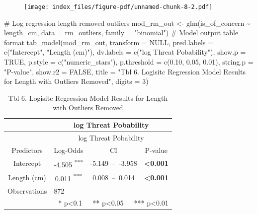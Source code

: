 \documentclass[
  letterpaper,
  DIV=11,
  numbers=noendperiod]{scrartcl}
\newenvironment{Shaded}{\begin{snugshade}}{\end{snugshade}}
\newcommand{\AttributeTok}[1]{\textcolor[rgb]{0.40,0.45,0.13}{#1}}
\newcommand{\CommentTok}[1]{\textcolor[rgb]{0.37,0.37,0.37}{#1}}
\newcommand{\ConstantTok}[1]{\textcolor[rgb]{0.56,0.35,0.01}{#1}}
\newcommand{\DecValTok}[1]{\textcolor[rgb]{0.68,0.00,0.00}{#1}}
\newcommand{\FloatTok}[1]{\textcolor[rgb]{0.68,0.00,0.00}{#1}}
\newcommand{\FunctionTok}[1]{\textcolor[rgb]{0.28,0.35,0.67}{#1}}
\newcommand{\NormalTok}[1]{\textcolor[rgb]{0.00,0.23,0.31}{#1}}
\newcommand{\OtherTok}[1]{\textcolor[rgb]{0.00,0.23,0.31}{#1}}
\newcommand{\SpecialCharTok}[1]{\textcolor[rgb]{0.37,0.37,0.37}{#1}}
\newcommand{\StringTok}[1]{\textcolor[rgb]{0.13,0.47,0.30}{#1}}
\begin{document}
\begin{figure}[H]

{\centering \texttt{[image: index\_files/figure-pdf/unnamed-chunk-8-2.pdf]}

}

\end{figure}

\begin{Shaded}
\begin{Highlighting}[]
\CommentTok{\# Log regression length removed outliers}
\NormalTok{mod\_rm\_out }\OtherTok{\textless{}{-}} \FunctionTok{glm}\NormalTok{(is\_of\_concern }\SpecialCharTok{\textasciitilde{}}\NormalTok{ length\_cm, }
                  \AttributeTok{data =}\NormalTok{ rm\_outliers, }
                  \AttributeTok{family =} \StringTok{"binomial"}\NormalTok{)}
\CommentTok{\# Model output table format}
\FunctionTok{tab\_model}\NormalTok{(mod\_rm\_out,}
          \AttributeTok{transform =} \ConstantTok{NULL}\NormalTok{,}
          \AttributeTok{pred.labels =} \FunctionTok{c}\NormalTok{(}\StringTok{"Intercept"}\NormalTok{, }\StringTok{"Length (cm)"}\NormalTok{),}
          \AttributeTok{dv.labels =} \FunctionTok{c}\NormalTok{(}\StringTok{"log Threat Pobability"}\NormalTok{),}
          \AttributeTok{show.p =} \ConstantTok{TRUE}\NormalTok{,}
          \AttributeTok{p.style =} \FunctionTok{c}\NormalTok{(}\StringTok{"numeric\_stars"}\NormalTok{),}
          \AttributeTok{p.threshold =} \FunctionTok{c}\NormalTok{(}\FloatTok{0.10}\NormalTok{, }\FloatTok{0.05}\NormalTok{, }\FloatTok{0.01}\NormalTok{),}
          \AttributeTok{string.p =} \StringTok{"P{-}value"}\NormalTok{,}
          \AttributeTok{show.r2 =} \ConstantTok{FALSE}\NormalTok{,}
          \AttributeTok{title =} \StringTok{"Tbl 6. Logisitc Regression Model Results for Length with Outliers Removed"}\NormalTok{,}
          \AttributeTok{digits =} \DecValTok{3}\NormalTok{)}
\end{Highlighting}
\end{Shaded}

\begin{longtable}[]{@{}cccc@{}}
\caption{Tbl 6. Logisitc Regression Model Results for Length with
Outliers Removed}\tabularnewline
\toprule()
~ & \multicolumn{3}{c}{log Threat Pobability} \\
\midrule()
\endfirsthead
\toprule()
~ & \multicolumn{3}{c}{log Threat Pobability} \\
\midrule()
\endhead
Predictors & Log-Odds & CI & P-value \\
Intercept & -4.505 \textsuperscript{***} & -5.149~--~-3.958 &
\textbf{\textless0.001} \\
Length (cm) & 0.011 \textsuperscript{***} & 0.008~--~0.014 &
\textbf{\textless0.001} \\
Observations & \multicolumn{3}{l}{872} \\
\multicolumn{4}{r}{* p\textless0.1~~~** p\textless0.05~~~***
p\textless0.01} \\
\bottomrule()
\end{longtable}
\end{document}
